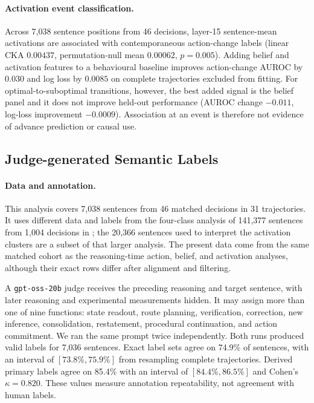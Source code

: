 \documentclass{article}
\begin{document}
\paragraph{Activation event classification.}
Across 7,038 sentence positions from 46 decisions, layer-15 sentence-mean
activations are associated with contemporaneous action-change labels (linear
CKA $0.00437$, permutation-null mean $0.00062$, $p=0.005$). Adding belief
and activation features to a behavioural baseline improves action-change
AUROC by $0.030$ and log loss by $0.0085$ on complete trajectories excluded
from fitting. For
optimal-to-suboptimal transitions, however, the best added signal is the belief
panel and it does not improve held-out performance (AUROC change $-0.011$,
log-loss improvement $-0.0009$). Association at an event is therefore not
evidence of advance prediction or causal use.

\subsection{Judge-generated Semantic Labels}
\label{app:judge_semantic_labels}

\paragraph{Data and annotation.}
This analysis covers 7,038 sentences from 46 matched decisions in 31
trajectories. It uses different data and labels from the four-class analysis of
141,377 sentences from 1,004 decisions in ; the 20,366
sentences used to interpret the activation clusters are a subset of that larger
analysis. The present data come from the same matched cohort as the
reasoning-time action, belief, and activation analyses, although their exact
rows differ after alignment and filtering.

A \texttt{gpt-oss-20b} judge receives the preceding reasoning
and target sentence, with later reasoning and experimental measurements hidden.
It may assign more than one of nine functions: state readout, route planning,
verification, correction, new inference, consolidation, restatement,
procedural continuation, and action commitment. We ran the same prompt twice
independently. Both runs produced valid labels for 7,036 sentences. Exact label
sets agree on 74.9\% of sentences, with an interval of
$[73.8\%,75.9\%]$ from resampling complete trajectories. Derived primary
labels agree on 85.4\% with an interval of $[84.4\%,86.5\%]$ and Cohen's
$\kappa=0.820$. These values measure annotation
repeatability, not agreement with human labels.
\end{document}
